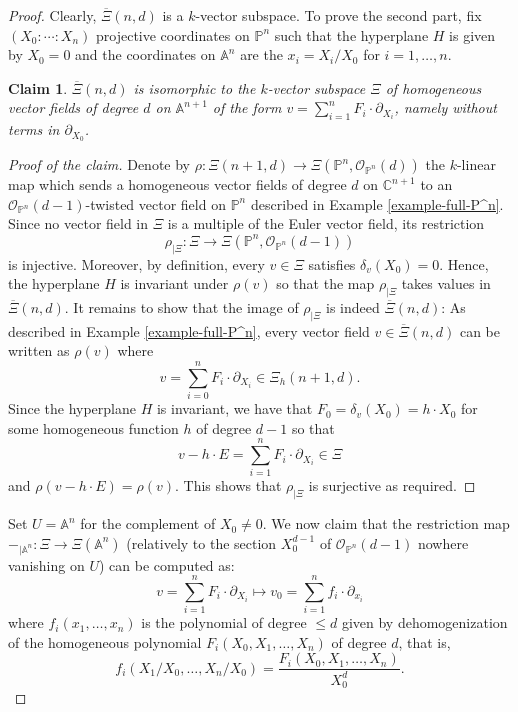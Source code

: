 \documentclass[12pt]{amsart}
\renewcommand{\P}{\mathbb{P}}
\theoremstyle{definition}
\theoremstyle{plain}
\newtheorem*{claimproof}{Claim}
\theoremstyle{exampstyle}
\theoremstyle{exampstyle}\newtheorem{thmxbis}{Theorem}
\numberwithin{equation}{section}
\theoremstyle{remark}
\begin{document}
\begin{proof} 
Clearly, $\overline{\Xi}(n,d)$ is a $k$-vector subspace. To prove the second part, fix $(X_0: \cdots: X_n)$ projective coordinates on $\P^n$ such that the hyperplane $H$ is given by $X_0 = 0$ and the coordinates on $\mathbb A^n$ are the $x_i = X_i/X_0$
for $i = 1,\ldots, n$. 

\begin{claimproof} 
$\overline{\Xi}(n,d)$ is isomorphic to the $k$-vector subspace $\Xi$ of homogeneous vector fields of degree $d$ on $\mathbb{A}^{n+1}$ of the form 
$v = \sum_{i = 1}^n F_i \cdot \partial_{X_i}$, namely without terms in $\partial_{X_0}$.
\end{claimproof}
\begin{proof}[Proof of the claim] 
Denote by $\rho : \Xi(n+1,d) \rightarrow \Xi(\mathbb{P}^n, \mathcal O_{\P^n}(d))$ the $k$-linear map which sends a homogeneous vector fields of degree $d$ on $\mathbb{C}^{n+1}$ to an $\mathcal{O}_{\P^n}(d-1)$-twisted vector field on $\P^n$ described in Example \ref{example-full-P^n}. Since no vector field in $\Xi$ is a multiple of the Euler vector field, its restriction
$$ \rho_{\mid \Xi}: \Xi \rightarrow \Xi(\P^n,\mathcal O_{\P^n}(d-1))$$
is injective. Moreover, by definition, every $v \in \Xi$ satisfies $\delta_v(X_0) = 0$. Hence, the hyperplane $H$ is invariant under $\rho(v)$ so that the map $\rho_{\mid \Xi}$ takes values in $\overline{\Xi}(n,d)$. It remains to show that the image of $\rho_{\mid \Xi}$ is indeed $\overline{\Xi}(n,d)$: As described in Example \ref{example-full-P^n}, every vector field $v \in \overline{\Xi}(n,d)$ can be written as $\rho(v)$ where
$$ v = \sum_{i = 0}^n F_i \cdot \partial_{X_i} \in \Xi_h(n+1,d).$$ 
Since the hyperplane $H$ is invariant, we have that 
$F_0 = \delta_v(X_0) = h \cdot X_0$ 
for some homogeneous function $h$ of degree $d-1$ so that  
$$ v - h \cdot E = \sum_{i = 1}^n F_i \cdot \partial_{X_i} \in \Xi$$
and $\rho(v - h\cdot E) = \rho(v)$. This shows that $ \rho_{\mid \Xi}$ is surjective as required.
\end{proof} 
Set $U = \mathbb{A}^n$ for the complement of $X_0 \neq 0$. We now claim that the restriction map
$-_{\mid \mathbb{A}^n}: \Xi \rightarrow \Xi(\mathbb{A}^n) $
(relatively to the section $X_0^{d-1}$ of $\mathcal O_{\P^n}(d-1)$ nowhere vanishing on $U$) can be computed as:
$$ v = \sum_{i = 1}^n F_i \cdot \partial_{X_i} \mapsto v_0 = \sum_{i = 1}^n f_i \cdot \partial_{x_i}   $$ 
where $f_i(x_1,\ldots, x_n)$ is the polynomial of degree $\leq d$ given by dehomogenization of the homogeneous polynomial $F_i(X_0, X_1,\ldots, X_n)$ of degree $d$, that is,
$$f_i(X_1/X_0,\ldots, X_n/X_0) = \frac {F_i(X_0,X_1,\ldots, X_n)} {X_0^d}.$$ 



\end{proof}
\end{document}
